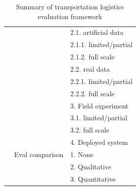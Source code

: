 \documentclass[11pt,letterpaper,onecolumn,twoside,openright,draft]{report}
\begin{document}
\begin{table}[htbp]
\begin{tabular}{|l|p{}|p{}|}
          &       &   2.1. artificial data \\
          &       &     2.1.1. limited/partial \\
          &       &     2.1.2. full scale \\
          &       &   2.2. real data \\
          &       &     2.2.1. limited/partial \\
          &       &     2.2.2. full scale \\
          &       & 3. Field experiment \\
          &       &   3.1. limited/partial \\
          &       &   3.2. full scale \\
          &       & 4. Deployed system \\
          \cline{2-3}
          & Eval comparison & 1. None \\
          &       & 2. Qualitative \\
          &       & 3. Quantitative \\
    \hline
    \end{tabular}%
  \caption{Summary of transportation logistics evaluation framework}
  \label{tab:transport-logistics-eval-framework}%
\end{table}%
\end{document}
